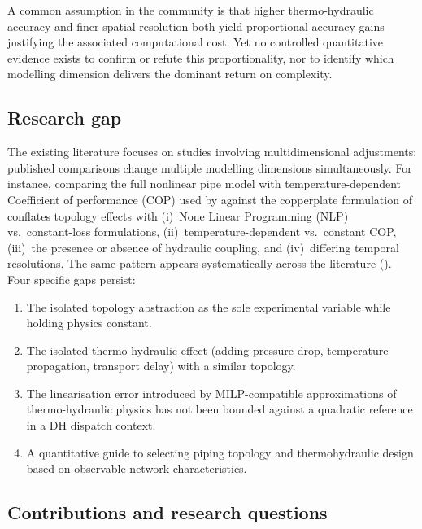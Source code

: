\documentclass[a4paper,fleqn]{cas-dc}
\begin{document}
A common assumption in the community is that higher thermo-hydraulic accuracy and finer spatial resolution both yield proportional accuracy
gains justifying the associated computational cost. Yet no
controlled quantitative evidence exists to confirm or refute this
proportionality, nor to identify which modelling dimension delivers
the dominant return on complexity.

\subsection{Research gap}
\label{sec:gap}

The existing literature focuses on studies involving multidimensional adjustments: published comparisons change
multiple modelling dimensions simultaneously. For instance,
comparing the full nonlinear pipe model with temperature-dependent
Coefficient of performance (COP) used by \citet{Vesterlund2017} against the
copperplate formulation of \citet{Gabrielli2018}
conflates topology effects with (i)~None Linear Programming (NLP) vs.\ constant-loss
formulations, (ii)~temperature-dependent vs.\ constant COP,
(iii)~the presence or absence of hydraulic coupling, and
(iv)~differing temporal resolutions. The same pattern appears
systematically across the literature
(). Four specific gaps persist:
%
\begin{enumerate}[nosep]
  \item The isolated topology abstraction as the sole
        experimental variable while holding physics constant.
  \item The isolated thermo-hydraulic effect (adding
        pressure drop, temperature propagation, transport delay)
        with a similar topology.
  \item The linearisation error introduced by MILP-compatible
        approximations of thermo-hydraulic physics has not been
        bounded against a quadratic reference in a DH dispatch
        context.
  \item A quantitative guide to selecting piping topology and
        thermohydraulic design based on observable network characteristics.
\end{enumerate}

\subsection{Contributions and research questions}
\label{sec:contributions}
\end{document}
